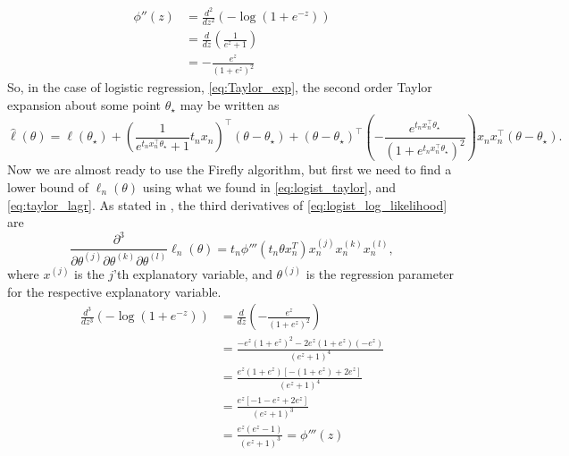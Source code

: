 \begin{equation}\label{eq:loglist_second_der}
    \begin{split}
       \phi''\left(z\right) & = \frac{d^2}{dz^2}\left(-\log\left(1 + e^{-z} \right)\right) \\
        & = \frac{d}{dz} \left(\frac{1}{e^z +1}\right) \\
        & = -\frac{e^z}{\left(1 + e^z\right)^2} 
\end{split} 
\end{equation}
So, in the case of logistic regression, \eqref{eq:Taylor_exp}, the second order Taylor expansion about some point $\theta_{\star}$ may be written as 
\begin{equation}\label{eq:logist_taylor}
    \hat{\ell}\left(\theta\right)= \ell\left(\theta_{\star}\right) + \left(\frac{1}{e^{t_n x_n^{\top}\theta_{\star} } + 1} t_n x_n\right)^{\top}
    \left(\theta - \theta_{\star} \right) 
    + \left(\theta - \theta_{\star}\right)^{\top}
    \left(-\frac{e^{t_n x_n^{\top}\theta_{\star} }}{\left(1 + e^{t_n x_n^{\top}\theta_{\star} }\right)^2}\right)x_n x_n^{\top} \left(\theta - \theta_{\star}\right).  
\end{equation}{}
Now we are almost ready to use the Firefly algorithm, but first we need to find a lower bound of $\ell_n\left(\theta\right)$ using what we found in \eqref{eq:logist_taylor}, and \eqref{eq:taylor_lagr}.  
As stated in \cite{Bardenet:1}, the third derivatives of \eqref{eq:logist_log_likelihood} are 
\begin{equation}\label{eq:logist_third_der}
    \frac{\partial^3}{\partial\theta^{\left(j\right)}\partial \theta^{\left(k\right)}\partial\theta^{\left(l\right)}}  \ell_n\left(\theta\right)= t_n \phi'''\left(t_n\theta x_n^T\right) x_n^{\left(j\right)}x_n^{\left(k\right)}x_n^{\left(l\right)},
\end{equation} where $x^{\left(j\right)}$ is the $j$'th explanatory variable, and $\theta^{\left(j\right)}$ is the regression parameter for the respective explanatory variable. 
\begin{equation*}
\begin{split}
    \frac{d^3}{dz^3}\left( -\log\left(1 + e^{-z}\right)\right) &= \frac{d}{dz}\left( - \frac{e^z}{\left(1 + e^z\right)^2}\right) \\
    & = \frac{- e^z \left(1 + e^z\right)^2 - 2e^z\left(1 + e^z\right)\left(-e^z\right)}{\left(e^z + 1\right)^4}\\
    &=\frac{e^z\left(1+e^z\right)\left[-\left(1 + e^z\right) + 2e^z\right]}{\left(e^z + 1\right)^4} \\
    &= \frac{e^z\left[-1 -e^z + 2e^z\right]}{\left(e^z + 1\right)^3} \\
    &= \frac{e^z \left(e^z -1\right)}{\left(e^z + 1 \right)^3} = \phi '''\left(z\right)
\end{split}
\end{equation*}   
